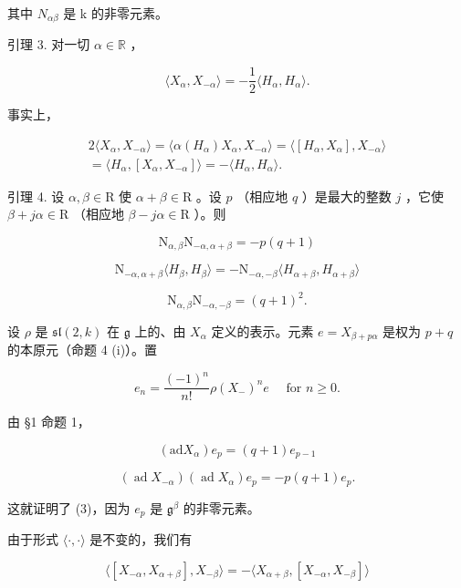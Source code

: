 其中 \(N_{\alpha\beta}\) 是 k 的非零元素。

引理 3. 对一切 \(\alpha \in \mathbb{R}\) ，

\[
\langle X _ {\alpha}, X _ {- \alpha} \rangle = - \frac {1}{2} \langle H _ {\alpha}, H _ {\alpha} \rangle .
\]

事实上，

\[
\begin{array}{c} 2 \langle X _ {\alpha}, X _ {- \alpha} \rangle = \langle \alpha (H _ {\alpha}) X _ {\alpha}, X _ {- \alpha} \rangle = \langle [ H _ {\alpha}, X _ {\alpha} ], X _ {- \alpha} \rangle \\ = \langle H _ {\alpha}, [ X _ {\alpha}, X _ {- \alpha} ] \rangle = - \langle H _ {\alpha}, H _ {\alpha} \rangle . \end{array}
\]

引理 4. 设 \(\alpha, \beta \in \mathrm{R}\) 使 \(\alpha + \beta \in \mathrm{R}\) 。设 \(p\) （相应地 \(q\) ）是最大的整数 \(j\) ，它使 \(\beta + j\alpha \in \mathrm{R}\) （相应地 \(\beta - j\alpha \in \mathrm{R}\) ）。则

\[
\mathrm{N} _ {\alpha , \beta} \mathrm{N} _ {- \alpha , \alpha + \beta} = - p (q + 1)\tag{3}
\]

\[
\mathrm{N} _ {- \alpha , \alpha + \beta} \langle H _ {\beta}, H _ {\beta} \rangle = - \mathrm{N} _ {- \alpha , - \beta} \langle H _ {\alpha + \beta}, H _ {\alpha + \beta} \rangle\tag{4}
\]

\[
\mathrm{N} _ {\alpha , \beta} \mathrm{N} _ {- \alpha , - \beta} = (q + 1) ^ {2}.\tag{5}
\]

设 \(\rho\) 是 \(\mathfrak{sl}(2,k)\) 在 \(\mathfrak{g}\) 上的、由 \(X_{\alpha}\) 定义的表示。元素 \(e = X_{\beta + p\alpha}\) 是权为 \(p + q\) 的本原元（命题 4 (i)）。置

\[
e _ {n} = \frac {(- 1) ^ {n}}{n !} \rho (X _ {-}) ^ {n} e \quad \text { for } n \geq 0.
\]

由 §1 命题 1，

\[
(\mathrm{ad} X _ {\alpha}) e _ {p} = (q + 1) e _ {p - 1}
\]

\[
(\operatorname{ad} X _ {- \alpha}) (\operatorname{ad} X _ {\alpha}) e _ {p} = - p (q + 1) e _ {p}.
\]

这就证明了 (3)，因为 \(e_p\) 是 \(\mathfrak{g}^{\beta}\) 的非零元素。

由于形式 \(\langle \cdot, \cdot \rangle\) 是不变的，我们有

\[
\langle [ X _ {- \alpha}, X _ {\alpha + \beta} ], X _ {- \beta} \rangle = - \langle X _ {\alpha + \beta}, [ X _ {- \alpha}, X _ {- \beta} ] \rangle
\]

